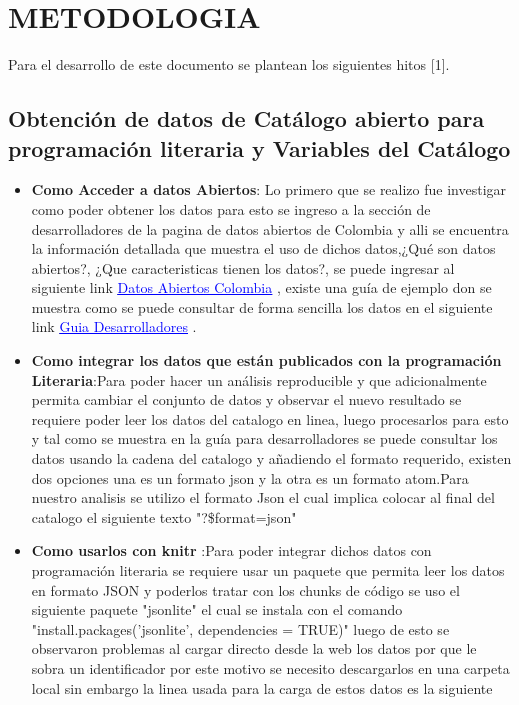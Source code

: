 \section{METODOLOGIA}

 Para el desarrollo de este documento se plantean los siguientes hitos [1].
 
  \subsection{Obtención de datos de Catálogo abierto para programación literaria y Variables del Catálogo}
 
  \begin{itemize}
   \item \textbf{Como Acceder a datos Abiertos}: Lo primero que se realizo fue  investigar como poder obtener los datos para esto se ingreso a la sección de desarrolladores de la pagina de datos abiertos de Colombia y alli se encuentra la información detallada que muestra el uso de dichos datos,¿Qué son datos abiertos?,  ¿Que caracteristicas tienen los datos?, se puede ingresar al siguiente link 
	\href{http://www.datos.gov.co/frm/Acerca/frmAcercaDe.aspx}{\textcolor{blue}{\underline{Datos Abiertos Colombia}}}
   , existe una guía de ejemplo don se muestra como se puede consultar de forma sencilla los datos en el siguiente link   
   \href{http://ogdidata.blob.core.windows.net/documentos/articles-9407_GuiaDesarrolladores.pdf}{\textcolor{blue}{\underline{Guia Desarrolladores}}}
    .\\
   
       \item \textbf{Como integrar los datos que están publicados con la programación Literaria}:Para poder hacer un análisis reproducible y que adicionalmente permita cambiar el conjunto de datos y observar el nuevo resultado se requiere poder leer los datos del catalogo en linea, luego procesarlos para esto y tal como se muestra en la guía para desarrolladores se puede consultar los datos usando la cadena del catalogo y añadiendo el formato requerido, existen dos opciones una es un formato json y la otra es un formato atom.Para nuestro analisis se utilizo el formato Json el cual implica colocar al final del catalogo el siguiente texto "?\$format=json" \\ 
       
   
   \item \textbf{Como usarlos con knitr }:Para poder integrar dichos datos con programación literaria se requiere usar un paquete que permita leer los datos en formato JSON y poderlos tratar con los chunks de código  se uso el siguiente paquete  "jsonlite" el cual se instala con el comando "install.packages('jsonlite', dependencies = TRUE)" luego de esto se observaron problemas al cargar directo desde la web los datos por que le sobra un identificador por este motivo se necesito descargarlos en una carpeta local sin embargo la linea usada para la carga de estos datos es la siguiente 
   

\end{itemize}
